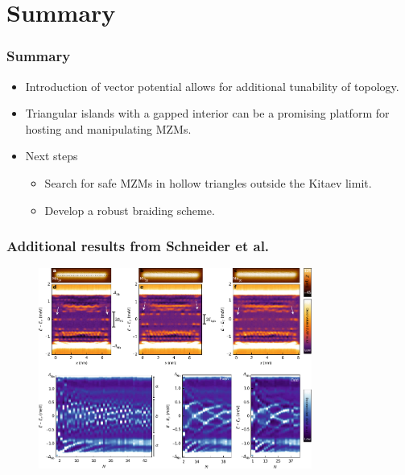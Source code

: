 \documentclass[xcolor=dvipsnames,10pt,aspectratio=169]{beamer}
\newcommand{\CO}{Summary}
\begin{document}
  \section[Summary]{\CO}
  \begin{frame}
    \frametitle{\CO}

    \begin{itemize}
      \item Introduction of vector potential allows for additional tunability of topology.
      \item Triangular islands with a gapped interior can be a promising platform for hosting and manipulating MZMs.
      \item Next steps
        \begin{itemize}
          \item Search for safe MZMs in hollow triangles outside the Kitaev limit.
          \item Develop a robust braiding scheme.
        \end{itemize}
    \end{itemize}
  \end{frame}


  \appendix

  \begin{frame}
    \frametitle{Additional results from Schneider et al.}

    \begin{figure}
      \includegraphics[width=0.8\textwidth]{./figures/Schneider-additional-results.pdf}
    \end{figure}

  \end{frame}
\end{document}
